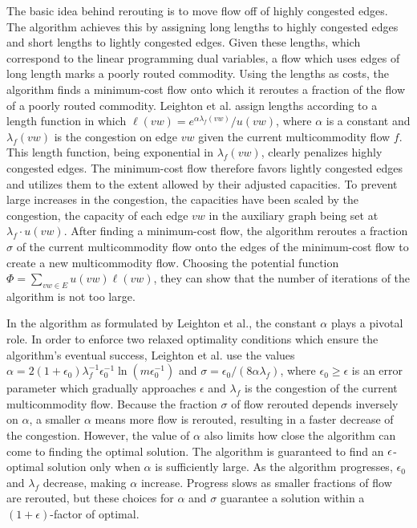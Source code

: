 The basic idea behind rerouting is to move flow off of highly congested
edges.  The algorithm achieves this by assigning long lengths to highly
congested edges and short lengths to lightly congested edges.
Given these lengths, which correspond to the linear programming dual variables,
a flow which uses edges of long length marks a poorly routed commodity.
Using the lengths as costs, the algorithm finds a
minimum-cost flow onto which it reroutes a fraction of the flow
of a poorly routed commodity.
Leighton et al. assign lengths according to a length function in which
$\ell (vw) = e^{\alpha \lambda _f(vw)} / u(vw)$, where $\alpha$ is a
constant and $\lambda _f(vw)$ is the congestion on edge $vw$ given the current
multicommodity flow $f$.  This length function, being exponential in
$\lambda _f(vw)$, clearly penalizes highly congested edges.
The minimum-cost flow therefore favors lightly congested edges and
utilizes them to the extent allowed by their adjusted capacities.
To prevent large increases in the congestion,
the capacities have been scaled by the congestion,
the capacity of each edge $vw$ in the auxiliary graph being set at 
$\lambda _f \cdot u(vw)$.
After finding a minimum-cost flow, 
the algorithm reroutes a fraction $\sigma$ of the current multicommodity flow
onto the edges of the minimum-cost flow to create a new multicommodity flow.
Choosing the potential function $\Phi = \sum _{vw \in E}u(vw)\ell
(vw)$, they can show that the number of iterations of the algorithm is
not too large.

In the algorithm as formulated by Leighton et al., the constant $\alpha$
plays a pivotal role.
In order to enforce two relaxed optimality conditions 
which ensure the algorithm's eventual success,
Leighton et al. use the values
$\alpha = 2(1+\epsilon_0)\lambda _f^{-1}\epsilon_0^{-1}\ln (m\epsilon_0^{-1})$
and $\sigma = \epsilon _0 / (8\alpha \lambda _f)$, where
$\epsilon _0 \geq \epsilon$ is an error parameter which gradually
approaches $\epsilon$
and $\lambda _f$ is the congestion of the current multicommodity flow.
Because the fraction $\sigma$ of flow rerouted depends inversely on $\alpha$,
a smaller $\alpha$ means more flow is rerouted, 
resulting in a faster decrease of the congestion.
However, the value of $\alpha$ also limits how close the algorithm can come
to finding the optimal solution.
The algorithm is guaranteed to find an $\epsilon$-optimal solution 
only when $\alpha$ is sufficiently large.  
As the algorithm progresses, $\epsilon _0$ and $\lambda _f$ decrease,
making $\alpha$ increase.  
Progress slows as smaller fractions of flow are rerouted, 
but these choices for $\alpha$ and $\sigma$ guarantee a solution
within a $(1+\epsilon)$-factor of optimal.

